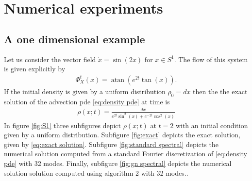 \documentclass[12pt]{amsart}
\begin{document}
\section{Numerical experiments}

\subsection{A one dimensional example}
Let us consider the vector field $\dot{x} = \sin(2x)$ for $x \in S^{1}$.
The flow of this system is given explicitly by
\begin{align}
	\Phi_{X}^{t}(x) = \operatorname{atan} \left( e^{2t} \tan(x) \right).
\end{align}
If the initial density is given by a uniform distribution $\rho_{0} = dx$ then the the exact solution of the advection pde \eqref{eq:density pde} at time is
\begin{align}
	\rho(x;t) =  \frac{dx}{e^{2t} \sin^{2}(x) + e^{-2t} \cos^{2}(x) } \label{eq:exact solution}
\end{align}
 In figure \ref{fig:S1} three subfigures depict $\rho(x;t)$ at $t=2$ with an initial condition given by a uniform distribution.
Subfigure \ref{fig:exact} depicts the exact solution, given by \eqref{eq:exact solution}.  Subfigure \ref{fig:standard spectral} depicts the numerical solution computed
from a standard Fourier discretization of \eqref{eq:density pde} with 32 modes.
Finally, subfigure \ref{fig:gn spectral} depicts the numerical solution solution computed using algorithm 2 with 32 modes..
\end{document}
